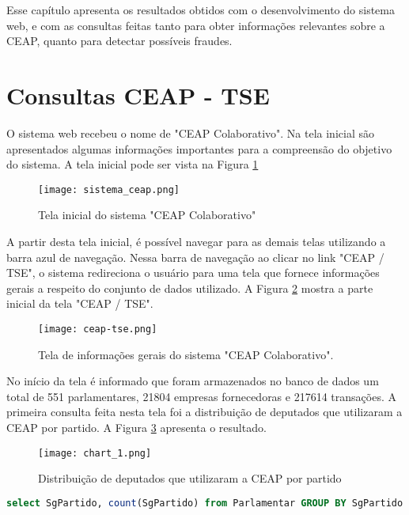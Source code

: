 Esse capítulo apresenta os resultados obtidos com o desenvolvimento do sistema web, e com as consultas feitas tanto para obter informações relevantes sobre a CEAP, quanto para detectar possíveis fraudes.

\section{Consultas CEAP - TSE}

O sistema web recebeu o nome de "CEAP Colaborativo". Na tela inicial são apresentados algumas informações importantes para a compreensão do objetivo do sistema. A tela inicial pode ser vista na Figura \ref{fig:sistema_ceap}

\begin{figure}[H]
\centering
\texttt{[image: sistema\_ceap.png]}
\caption{Tela inicial do sistema "CEAP Colaborativo"}
\label{fig:sistema_ceap}
\end{figure}

A partir desta tela inicial, é possível navegar para as demais telas utilizando a barra azul de navegação. Nessa barra de navegação ao clicar no link "CEAP / TSE", o sistema redireciona o usuário para uma tela que fornece informações gerais a respeito do conjunto de dados utilizado. A Figura \ref{fig:sistema_ceap_tse} mostra a parte inicial da tela "CEAP / TSE".

\begin{figure}[H]
\centering
\texttt{[image: ceap-tse.png]}
\caption{Tela de informações gerais do sistema "CEAP Colaborativo".}
\label{fig:sistema_ceap_tse}
\end{figure}

No início da tela é informado que foram armazenados no banco de dados um total de 551 parlamentares, 21804 empresas fornecedoras e 217614 transações.
A primeira consulta feita nesta tela foi a distribuição de deputados que utilizaram a CEAP por partido. A Figura \ref{fig:chart_1} apresenta o resultado.

\begin{figure}[H]
\centering
\texttt{[image: chart\_1.png]}
\caption{Distribuição de deputados que utilizaram a CEAP por partido}
\label{fig:chart_1}
\end{figure}

\begin{lstlisting}[label={lst:consulta_chart_1}, caption={Consulta para a Figura \ref{fig:chart_1}},captionpos=b, language=sql]
select SgPartido, count(SgPartido) from Parlamentar GROUP BY SgPartido
\end{lstlisting}


